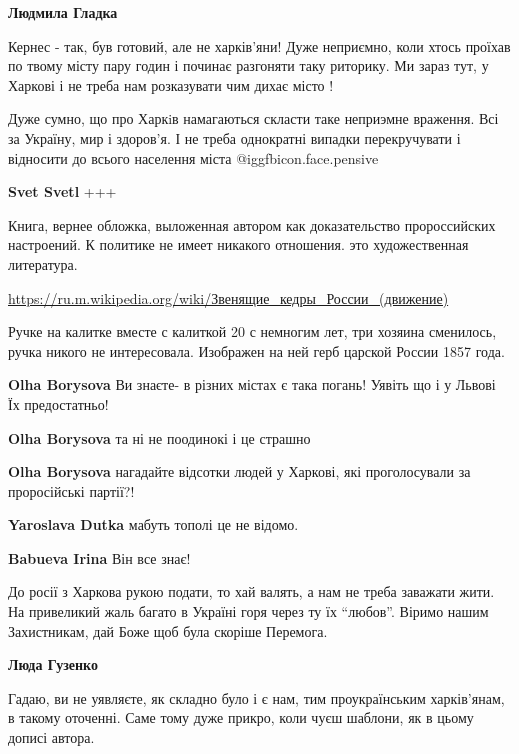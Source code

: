\begin{itemize}
\begin{itemize}
\textbf{Людмила Гладка} 

Кернес - так, був готовий, але не харків'яни! Дуже неприємно, коли хтось
проїхав по твому місту пару годин і починає разгоняти таку риторику. Ми зараз
тут, у Харкові і не треба нам розказувати чим дихає місто !


Дуже сумно, що про Харкiв намагаються скласти таке неприэмне враження. Всі за
Україну, мир і здоров'я. І не треба однократні випадки перекручувати і
відносити до всього населення міста  @igg{fbicon.face.pensive} 

\textbf{Svet Svetl} +++


Книга, вернее обложка, выложенная автором как доказательство пророссийских
настроений. К политике не имеет никакого отношения. это художественная
литература.

\url{https://ru.m.wikipedia.org/wiki/Звенящие_кедры_России_(движение)}


Ручке на калитке вместе с калиткой 20 с немногим лет, три хозяина сменилось,
ручка никого не интересовала. Изображен на ней герб царской России 1857 года.

\textbf{Olha Borysova} Ви знаєте- в різних містах є така погань! Уявіть що і у Львові Їх предостатньо!

\textbf{Olha Borysova} та ні не поодинокі і це страшно

\textbf{Olha Borysova} нагадайте відсотки людей у Харкові, які проголосували за проросійські партії?!

\textbf{Yaroslava Dutka} мабуть тополі це не відомо.

\textbf{Babueva Irina} Він все знає!

\end{itemize} %


До росії з Харкова рукою подати, то хай валять, а нам не треба заважати жити.
На привеликий жаль багато в Україні горя через ту їх \enquote{любов}. Віримо нашим
Захистникам, дай Боже щоб була скоріше Перемога.

\begin{itemize} %
\textbf{Люда Гузенко}

Гадаю, ви не уявляєте, як складно було і є нам, тим проукраїнським харків'янам,
в такому оточенні. Саме тому дуже прикро, коли чуєш шаблони, як в цьому дописі
автора.


\end{itemize}
\end{itemize}
